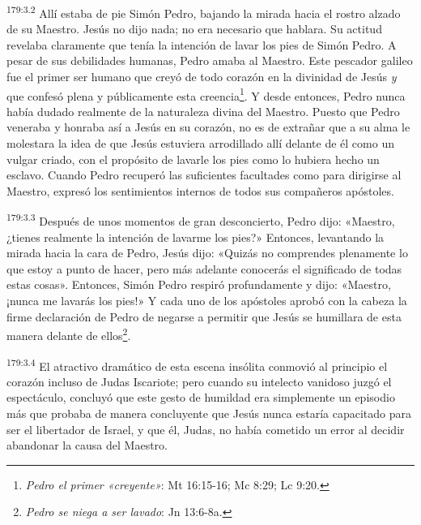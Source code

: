 \par
\textsuperscript{179:3.2} Allí estaba de pie Simón Pedro, bajando la mirada hacia el rostro alzado de su Maestro. Jesús no dijo nada; no era necesario que hablara. Su actitud revelaba claramente que tenía la intención de lavar los pies de Simón Pedro. A pesar de sus debilidades humanas, Pedro amaba al Maestro. Este pescador galileo fue el primer ser humano que creyó de todo corazón en la divinidad de Jesús \textit{y} que confesó plena y públicamente esta creencia\footnote{\textit{Pedro el primer «creyente»}: Mt 16:15-16; Mc 8:29; Lc 9:20.}. Y desde entonces, Pedro nunca había dudado realmente de la naturaleza divina del Maestro. Puesto que Pedro veneraba y honraba así a Jesús en su corazón, no es de extrañar que a su alma le molestara la idea de que Jesús estuviera arrodillado allí delante de él como un vulgar criado, con el propósito de lavarle los pies como lo hubiera hecho un esclavo. Cuando Pedro recuperó las suficientes facultades como para dirigirse al Maestro, expresó los sentimientos internos de todos sus compañeros apóstoles.

\par
\textsuperscript{179:3.3} Después de unos momentos de gran desconcierto, Pedro dijo: «Maestro, ¿tienes realmente la intención de lavarme los pies?» Entonces, levantando la mirada hacia la cara de Pedro, Jesús dijo: «Quizás no comprendes plenamente lo que estoy a punto de hacer, pero más adelante conocerás el significado de todas estas cosas». Entonces, Simón Pedro respiró profundamente y dijo: «Maestro, ¡nunca me lavarás los pies!» Y cada uno de los apóstoles aprobó con la cabeza la firme declaración de Pedro de negarse a permitir que Jesús se humillara de esta manera delante de ellos\footnote{\textit{Pedro se niega a ser lavado}: Jn 13:6-8a.}.

\par
\textsuperscript{179:3.4} El atractivo dramático de esta escena insólita conmovió al principio el corazón incluso de Judas Iscariote; pero cuando su intelecto vanidoso juzgó el espectáculo, concluyó que este gesto de humildad era simplemente un episodio más que probaba de manera concluyente que Jesús nunca estaría capacitado para ser el libertador de Israel, y que él, Judas, no había cometido un error al decidir abandonar la causa del Maestro.


